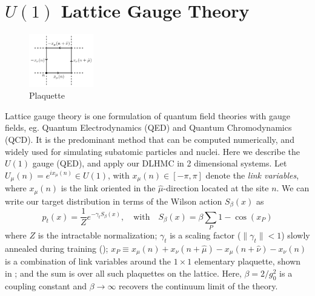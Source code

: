 \documentclass{article} %
\begin{document}
\section{\label{sec:latticegaugetheory}\(U(1)\) Lattice Gauge Theory}
%
\begin{figure}
      \centering
      \includegraphics[width=0.25\textwidth]{figures/plaq_tikz.pdf}
      \caption{\label{fig:plaquette}Plaquette}%
\end{figure}
Lattice gauge theory is one formulation of quantum field theories with gauge fields, eg. Quantum Electrodynamics (QED) and Quantum Chromodynamics (QCD).
It is the predominant method that can be computed numerically, and widely used for simulating subatomic particles and nuclei.
Here we describe the \(U(1)\) gauge (QED), and apply our DLHMC in 2 dimensional systems.
Let \(U_{\mu}(n) = e^{i x_{\mu}(n)} \in U(1)\), with \(x_{\mu}(n) \in [-\pi,\pi]\) denote the \emph{link
variables}, where \(x_{\mu}(n)\) is the link oriented in the \(\hat{\mu}\)-direction located at the site
\(n\).
%
We can write our target distribution in terms of the Wilson action \(S_{\beta}(x)\) as
%
\begin{equation}
   p_{t}(x) = \frac{1}{Z}e^{-\gamma_{t} S_{\beta}(x)},\quad\text{with}\quad S_{\beta}(x) = \beta \sum_{P}1 - \cos(x_{P})
   \label{eq:wilsonaction}
\end{equation}
%
where $Z$ is the intractable normalization;
\(\gamma_{t}\) is a scaling factor (\(\|\gamma_{t}\|<1\)) slowly annealed during training ();
\(x_{P} \equiv x_{\mu}(n) + x_{\nu}(n+\hat{\mu}) - x_{\mu}(n+\hat{\nu}) -x_{\nu}(n)\) is a combination of link
variables around the \(1\times1\) elementary plaquette, shown in ; and the sum is over all
such plaquettes on the lattice.
%
Here, \(\beta = 2 / g_{0}^{2}\) is a coupling constant and \(\beta\rightarrow\infty\) recovers the continuum limit of the theory. 
%
\end{document}
